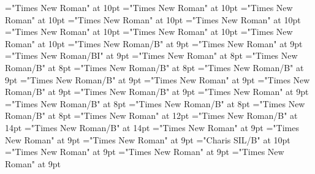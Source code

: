 \documentclass[gps1,twoside]{article}
\begin{document}
\font\complexformtypesvisiblecomplexformbackrefvisiblecomplexformbackrefsminorentryvariantafter="Times New Roman" at 10pt
\font\spanspanreverseabbrcomplexformtypecomplexformtypesvisiblecomplexformbackrefvisiblecomplexformbackrefsminorentryvariantbefore="Times New Roman" at 10pt
\font\spanspanheadwordvisiblecomplexformbackrefvisiblecomplexformbackrefsminorentryvariantbefore="Times New Roman" at 10pt
\font\spanspandefinitionorglossesvisiblecomplexformbackrefvisiblecomplexformbackrefsminorentryvariantbefore="Times New Roman" at 10pt
\font{}="Times New Roman" at 10pt
\font\spanspanowningentrysummarydefinitionvisiblecomplexformbackrefvisiblecomplexformbackrefsminorentryvariantbefore="Times New Roman" at 10pt
\font\spanowningentrysummarydefinitionvisiblecomplexformbackrefvisiblecomplexformbackrefsminorentryvariantfirstchildbefore="Times New Roman" at 10pt
\font\spanowningentrysummarydefinitionvisiblecomplexformbackrefvisiblecomplexformbackrefsminorentryvariantlastchildafter="Times New Roman" at 10pt
\font\xitemxitemcrossrefbefore="Times New Roman/B" at 9pt
\font\xitemxitemcrossreftargetsbefore="Times New Roman" at 9pt
\font\xitemxitemcrossreftypebefore="Times New Roman/BI" at 9pt
\font\xitemxitemexamplebefore="Times New Roman" at 8pt
\font\xitemxitemheadwordbefore="Times New Roman/B" at 8pt
\font\xitemxitemheadwordminorbefore="Times New Roman/B" at 8pt
\font\xitemxitemmainentryrefbefore="Times New Roman/B" at 9pt
\font\xitemxitemmainentryrefminorbefore="Times New Roman/B" at 9pt
\font\xitemxitempronunciationminorbefore="Times New Roman" at 9pt
\font\xitemxitemsensecrossrefbefore="Times New Roman/B" at 9pt
\font\xitemxitemsensemainentryrefbefore="Times New Roman/B" at 9pt
\font\xitemxitemtranslationbefore="Times New Roman" at 9pt
\font\xitemxitemheadwordsubbefore="Times New Roman/B" at 8pt
\font\xitemxitemLexEntrypublishRootMinorPrimaryTargetMLHeadWordPubbefore="Times New Roman/B" at 8pt
\font\xitemxitemLexEntrypublishStemMinorPrimaryTargetMLHeadWordPubbefore="Times New Roman/B" at 8pt
\font\xitemtpi="Times New Roman" at 12pt
\font{}="Times New Roman/B" at 14pt
\font{}="Times New Roman/B" at 14pt
\font{}="Times New Roman" at 9pt
\font\diventryletData="Times New Roman" at 9pt
\font\spandiventryletData="Times New Roman" at 9pt
\font\spanbzhspandiventryletData="Charis SIL/B" at 10pt
\font\sensesentryafterdiventryletData="Times New Roman" at 9pt
\font\spanspandiventryletData="Times New Roman" at 9pt
\font\sensespanspandiventryletData="Times New Roman" at 9pt
\end{document}
